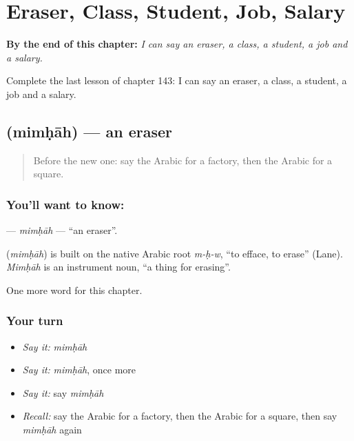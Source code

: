 
\chapter{Eraser, Class, Student, Job, Salary}
\label{ch:ar-eraser-class-student-job-salary}

\begin{chapteropening}
\textbf{By the end of this chapter:} \emph{I can say an eraser, a class, a student, a job and a salary.}

Complete the last lesson of chapter 143: I can say an eraser, a class, a student, a job and a salary.
\end{chapteropening}

\section[\texorpdfstring{\ar{ممحاة} (mimḥāh)}{ممحاة (mimḥāh)}]{ (mimḥāh) — an eraser}

\label{lesson:AR-C143-mimhah}



\begin{quote}
Before the new one: say the Arabic for a factory, then the Arabic for a square.
\end{quote}

\subsection*{You'll want to know: }
\textbf{} — \emph{mimḥāh} — \textquotedblleft{}an eraser\textquotedblright{}.

\begin{cousinweb}
\textbf{} (\emph{mimḥāh}) is built on the native Arabic root \emph{m-ḥ-w}, \textquotedblleft{}to efface, to erase\textquotedblright{} (Lane). \emph{Mimḥāh} is an instrument noun, \textquotedblleft{}a thing for erasing\textquotedblright{}.
\end{cousinweb}

\begin{grammarlens}[title={What you've built}]
One more word for this chapter.
\end{grammarlens}

\subsection*{Your turn}
\begin{itemize}
\raggedright
  \item \emph{Say it:} \emph{mimḥāh}
  \item \emph{Say it:} \emph{mimḥāh}, once more
  \item \emph{Say it:} say \emph{mimḥāh}
  \item \emph{Recall:} say the Arabic for a factory, then the Arabic for a square, then say \emph{mimḥāh} again
\end{itemize}

